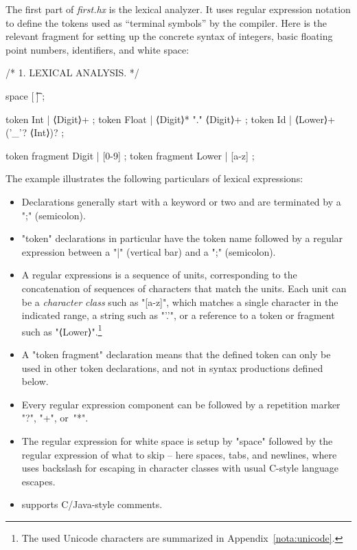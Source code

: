 \documentclass[11pt]{article} %
\begin{document}
\begin{example}\label{ex:lexical}
  The first part of \emph{first.hx} is the lexical analyzer. It uses regular expression notation to
  define the tokens used as ``terminal symbols'' by the compiler.  Here is the relevant fragment for
  setting up the concrete syntax of integers, basic floating point numbers, identifiers, and white
  space:
\begin{code}[xleftmargin=1.66em,numbers=left]
/* 1. LEXICAL ANALYSIS. */

space [ \t\n] ;

token Int    | ⟨Digit⟩+ ;
token Float  | ⟨Digit⟩* "." ⟨Digit⟩+ ;
token Id     | ⟨Lower⟩+ ('_'? ⟨Int⟩)? ;

token fragment Digit  | [0-9] ;
token fragment Lower  | [a-z] ;
\end{code}
  The example illustrates the following particulars of \HAX lexical expressions:
  \begin{itemize}

  \item Declarations generally start with a keyword or two and are terminated by a ";" (semicolon).

  \item "token" declarations in particular have the token name followed by a regular expression
    between a "|" (vertical bar) and a ";" (semicolon).

  \item A regular expressions is a sequence of units, corresponding to the concatenation of
    sequences of characters that match the units.  Each unit can be a \emph{character class} such as
    "[a-z]", which matches a single character in the indicated range, a string such as "'.'", or a
    reference to a token or fragment such as "⟨Lower⟩".\footnote{The used Unicode characters are
      summarized in Appendix~\ref{nota:unicode}.}

  \item A "token fragment" declaration means that the defined token can only be used in other token
    declarations, and not in syntax productions defined below.

  \item Every regular expression component can be followed by a repetition marker "?", "+", or~"*".

  \item The regular expression for white space is setup by "space" followed by the regular
    expression of what to skip -- here spaces, tabs, and newlines, where \HAX uses backslash for
    escaping in character classes with usual C-style language escapes.

  \item \HAX supports C/Java-style comments.

  \end{itemize}
\end{example}
\end{document}
